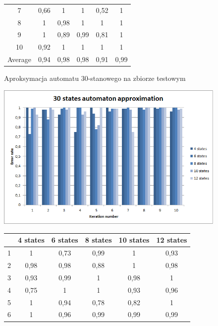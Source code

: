 \documentclass[runningheads,a4paper]{llncs}
\begin{document}
\begin{figure}[!htb]
\begin{tabular}{@{}cccccc@{}}
7       & 0,66     & 1        & 1        & 0,52      & 1    \\
8       & 1        & 0,98     & 1        & 1         & 1     \\
9       & 1        & 0,89     & 0,99     & 0,81      & 1 \\
10      & 0,92     & 1        & 1        & 1         & 1  \\ \bottomrule
Average & 0,94    & 0,98     & 0,98    & 0,91      & 0,99  \\ \bottomrule
\end{tabular}
\vspace{4mm}
\endminipage\hfill
\caption{Aproksymacja automatu 30-stanowego na zbiorze testowym}
\end{figure}

\begin{figure}[!htb]
\includegraphics[scale=0.92]{8.png}
\endminipage\hfill
\hspace{2.2cm}
\renewcommand{\arraystretch}{1.3}%
\begin{tabular}{@{}cccccc@{}}
\toprule
        & 4 states & 6 states & 8 states & 10 states & 12 states    \\ \midrule
1       & 1        & 0,73     & 0,99     & 1         & 0,93 \\
2       & 0,98     & 0,98     & 0,88     & 1         & 0,98 \\
3       & 0,93     & 0,99     & 1        & 0,98      & 1 \\
4       & 0,75     & 1        & 1        & 0,93      & 0,96   \\
5       & 1        & 0,94     & 0,78     & 0,82      & 1   \\
6       & 1        & 0,96     & 0,99     & 0,99      & 0,99    \\

\end{tabular}
\end{figure}
\end{document}
